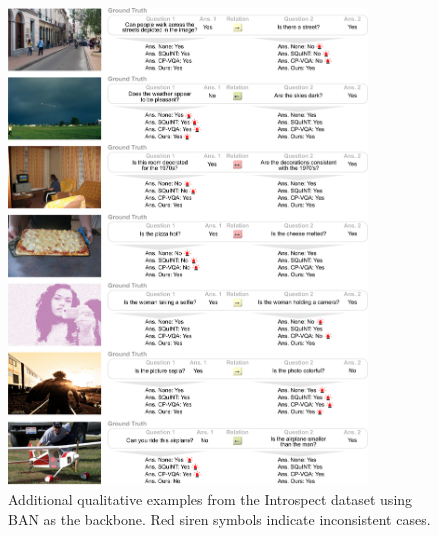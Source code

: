 \begin{figure}[!t]
\centering
\includegraphics[width=0.85\textwidth]{Figures/Part2_Consist/02_logic/examples_ban_supplementary4.pdf}
\caption{Additional qualitative examples from the Introspect dataset using BAN as the backbone. Red siren symbols indicate inconsistent cases.}
\label{fig:examples_introspect4}
\end{figure}


